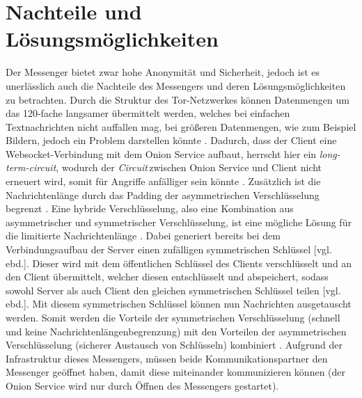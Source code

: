 \documentclass[a4paper,ngerman, headheight=28pt,12pt]{scrartcl}
\newcommand{\vcite}[1]{\cite[vgl.][]{#1}}
\newcommand{\vebd}{[vgl. ebd.]}
\newcommand{\circuit}{\textit{Circuit\,}}
\begin{document}
\section{Nachteile und Lösungsmöglichkeiten}
Der Messenger bietet zwar hohe Anonymität und Sicherheit, jedoch ist es unerlässlich auch die Nachteile des Messengers und deren Lösungsmöglichkeiten zu betrachten. Durch die Struktur des Tor-Netzwerkes können Datenmengen um das 120-fache langsamer übermittelt werden, welches bei einfachen Textnachrichten nicht auffallen mag, bei größeren Datenmengen, wie zum Beispiel Bildern, jedoch ein Problem darstellen könnte \vcite{TorPerformance}. Dadurch, dass der Client eine Websocket-Verbindung mit dem Onion Service aufbaut, herrscht hier ein \textit{long-term-circuit}, wodurch der \circuit zwischen Onion Service und Client nicht erneuert wird, somit für Angriffe anfälliger sein könnte \vcite{FAQCircuitLifetime}. Zusätzlich ist die Nachrichtenlänge durch das Padding der asymmetrischen Verschlüsselung begrenzt \vcite{OpensslRsaMaxLength}.
Eine hybride Verschlüsselung, also eine Kombination aus asymmetrischer und symmetrischer Verschlüsselung, ist eine mögliche Lösung für die limitierte Nachrichtenlänge \vcite{HybridEncryption}. Dabei generiert bereits bei dem Verbindungsaufbau der Server einen zufälligen symmetrischen Schlüssel \vebd. Dieser wird mit dem öffentlichen Schlüssel des Clients verschlüsselt und an den Client übermittelt, welcher diesen entschlüsselt und abspeichert, sodass sowohl Server als auch Client den gleichen symmetrischen Schlüssel teilen \vebd. Mit diesem symmetrischen Schlüssel können nun Nachrichten ausgetauscht werden.
Somit werden die Vorteile der symmetrischen Verschlüsselung (schnell und keine Nachrichtenlängenbegrenzung) mit den Vorteilen der asymmetrischen Verschlüsselung (sicherer Austausch von Schlüsseln) kombiniert \vcite{HybridTechnopedia}. Aufgrund der Infrastruktur dieses Messengers, müssen beide Kommunikationspartner den Messenger geöffnet haben, damit diese miteinander kommunizieren können (der Onion Service wird nur durch Öffnen des Messengers gestartet).
\end{document}
